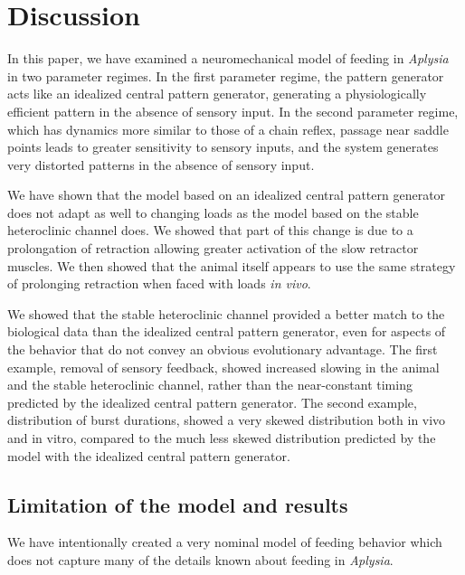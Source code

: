 
\section{Discussion}

In this paper, we have examined a neuromechanical model of feeding in \textit{Aplysia}
in two parameter regimes.  In the first parameter regime, the pattern generator
acts like an idealized central pattern generator, generating a physiologically
efficient pattern in the absence of sensory input.  In the second parameter
regime, which has dynamics more similar to those of a chain reflex, passage
near saddle points leads to greater sensitivity to sensory
inputs, and the system generates very distorted patterns in the absence of
sensory input.

We have shown that the model based on an idealized central pattern generator
does not adapt as well to changing loads as the model based on the stable
heteroclinic channel does.  We showed that part of this
change is due to a prolongation of retraction allowing greater activation of
the slow retractor muscles.  We then showed that the animal itself appears to use
the same strategy of prolonging retraction when faced with loads \textit{in vivo}.

We showed that the stable heteroclinic channel provided a better match to the
biological data than
the idealized central pattern generator, even for aspects of the behavior that do
not convey an obvious evolutionary advantage.  The first example, removal of
sensory feedback, showed increased slowing in the animal and the stable
heteroclinic channel, rather than
the near-constant timing predicted by the idealized central pattern generator.
The second example, distribution of burst durations, showed a very skewed
distribution both in vivo and in vitro, compared to the much less skewed
distribution predicted by the model with the idealized central pattern generator.

\subsection{Limitation of the model and results}

We have intentionally created a very nominal model of feeding behavior which
does not capture many of the details known about feeding in \textit{Aplysia}.


